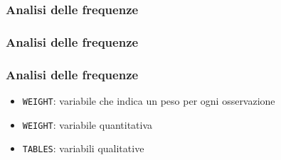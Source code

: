 \documentclass[12pt]{beamer}
\begin{document}











\begin{frame}[containsverbatim]\frametitle{Analisi delle frequenze}
\end{frame}


\begin{frame}[containsverbatim]\frametitle{Analisi delle frequenze}
\end{frame}

\begin{frame}[containsverbatim]\frametitle{Analisi delle frequenze}
  \begin{itemize}
  \item
    \verb+WEIGHT+: variabile che indica un peso per ogni osservazione
  \item
    \verb+WEIGHT+: variabile quantitativa
  \item
    \verb+TABLES+: variabili qualitative
  \end{itemize}
\end{frame}
\end{document}
